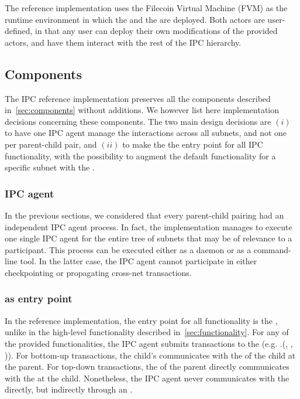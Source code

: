 The reference implementation uses the Filecoin Virtual Machine (FVM) as the runtime environment in which the \gw and the \sa are deployed. Both actors are user-defined, in that any user can deploy their own modifications of the provided actors, and have them interact with the rest of the IPC hierarchy.


\subsection{Components}
The IPC reference implementation preserves all the components described in~\cref{sec:components} without additions. We however list here implementation decisions concerning these components. The two main design decisions are $(i)$ to have one IPC agent manage the interactions across all subnets, and not one per parent-child pair, and $(ii)$ to make the \gw the entry point for all IPC functionality, with the possibility to augment the default functionality for a specific subnet with the \sa.

 \subsubsection{IPC agent} 
 In the previous sections, we considered that every parent-child pairing had an independent IPC agent process. In fact, the implementation manages to execute one single IPC agent for the entire tree of subnets that may be of relevance to a participant.  This process can be executed either as a daemon or as a command-line tool. In the latter case, the IPC agent cannot participate in either checkpointing or propagating cross-net transactions. %

\subsubsection{\gw as entry point}
\label{sec:gwrefimpl}

In the reference implementation, the entry point for all functionality is the \gw, unlike in the high-level functionality described in~\cref{sec:functionality}. For any of the provided functionalities, the IPC agent submits transactions to the \gw (e.g. \gw.(, , )). For bottom-up transactions, the child's \gw communicates with the \sa of the child at the parent. For top-down transactions, the \gw of the parent directly communicates with the \gw at the child. Nonetheless, the IPC agent never communicates with the \sa directly, but indirectly through an \gw.

